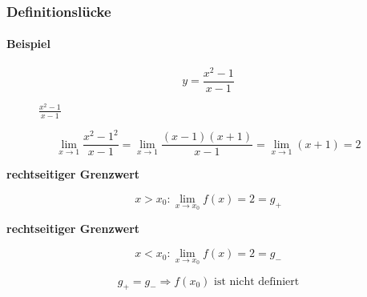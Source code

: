\subsubsection{Definitionslücke}

\paragraph{Beispiel}

\[
	y = \frac{x^2 - 1}{x - 1}
\]

\begin{figure}[H]
	\centering
	\caption{\(\frac{x^2 - 1}{x - 1}\)}
\end{figure}

\[
	\lim_{x \rightarrow 1} \frac{x^2 - 1^2}{x - 1}
	= \lim_{x \rightarrow 1} \frac{(x - 1)(x + 1)}{x - 1}
	= \lim_{x \rightarrow 1} (x+1)
	= 2
\]

\textbf{rechtseitiger Grenzwert}

\[
	x > x_0: \lim_{x \rightarrow x_0} f(x) = 2 = g_{+}
\]

\textbf{rechtseitiger Grenzwert}

\[
	x < x_0: \lim_{x \rightarrow x_0} f(x) = 2 = g_{-}
\]


\[
	g_{+} = g_{-} \Rightarrow \text{\(f(x_0)\) ist nicht definiert}
\]

